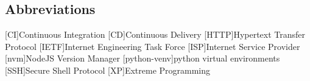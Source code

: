 \newcommand{\abbr}{Abbreviations}
\subsection{Abbreviations}

\begin{acronym}[1234567890]		%
\setlength{\itemsep}{-\parsep}	%

[CI]{Continuous Integration}
[CD]{Continuous Delivery}
[HTTP]{Hypertext Transfer Protocol}
[IETF]{Internet Engineering Task Force}
[ISP]{Internet Service Provider}
[nvm]{NodeJS Version Manager}
[python-venv]{python virtual environments}
[SSH]{Secure Shell Protocol}
[XP]{Extreme Programming}
\end{acronym}